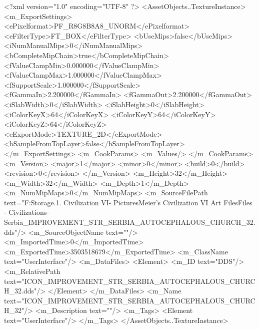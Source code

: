 <?xml version="1.0" encoding="UTF-8" ?>
<AssetObjects..TextureInstance>
	<m_ExportSettings>
		<ePixelformat>PF_R8G8B8A8_UNORM</ePixelformat>
		<eFilterType>FT_BOX</eFilterType>
		<bUseMips>false</bUseMips>
		<iNumManualMips>0</iNumManualMips>
		<bCompleteMipChain>true</bCompleteMipChain>
		<fValueClampMin>0.000000</fValueClampMin>
		<fValueClampMax>1.000000</fValueClampMax>
		<fSupportScale>1.000000</fSupportScale>
		<fGammaIn>2.200000</fGammaIn>
		<fGammaOut>2.200000</fGammaOut>
		<iSlabWidth>0</iSlabWidth>
		<iSlabHeight>0</iSlabHeight>
		<iColorKeyX>64</iColorKeyX>
		<iColorKeyY>64</iColorKeyY>
		<iColorKeyZ>64</iColorKeyZ>
		<eExportMode>TEXTURE_2D</eExportMode>
		<bSampleFromTopLayer>false</bSampleFromTopLayer>
	</m_ExportSettings>
	<m_CookParams>
		<m_Values/>
	</m_CookParams>
	<m_Version>
		<major>1</major>
		<minor>0</minor>
		<build>0</build>
		<revision>0</revision>
	</m_Version>
	<m_Height>32</m_Height>
	<m_Width>32</m_Width>
	<m_Depth>1</m_Depth>
	<m_NumMipMaps>0</m_NumMipMaps>
	<m_SourceFilePath text="F:\Mod Storage\2.1. Civilization VI\Mods\Archive - Pictures\Sid Meier's Civilization VI Art Files\Art Files - Civilizations\Civilization - Serbia\ICON_IMPROVEMENT_STR_SERBIA_AUTOCEPHALOUS_CHURCH_32.dds"/>
	<m_SourceObjectName text=""/>
	<m_ImportedTime>0</m_ImportedTime>
	<m_ExportedTime>3503518679</m_ExportedTime>
	<m_ClassName text="UserInterface"/>
	<m_DataFiles>
		<Element>
			<m_ID text="DDS"/>
			<m_RelativePath text="ICON_IMPROVEMENT_STR_SERBIA_AUTOCEPHALOUS_CHURCH_32.dds"/>
		</Element>
	</m_DataFiles>
	<m_Name text="ICON_IMPROVEMENT_STR_SERBIA_AUTOCEPHALOUS_CHURCH_32"/>
	<m_Description text=""/>
	<m_Tags>
		<Element text="UserInterface"/>
	</m_Tags>
</AssetObjects..TextureInstance>

